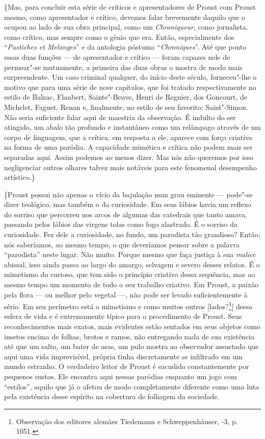 \{Mas, para concluir esta série de críticos e apresentadores de Proust
com Proust mesmo, como apresentador e crítico, devemos falar brevemente
daquilo que o ocupou ao lado de sua obra principal, como um
\emph{Chroniqueur}, como jornalista, como crítico, mas sempre como o
gênio que era. Então, especialmente dos ``\emph{Pastiches et Melanges}'' e
da antologia póstuma ``\emph{Chroniques}''. Até que ponto essas duas
funções --- de apresentador e crítico --- foram capazes nele de permear"-se
mutuamente, a primeira das duas obras o mostra de modo mais
surpreendente. Um caso criminal qualquer, do início deste século,
forneceu"-lhe o motivo que para uma série de nove capítulos, que foi
tratado respectivamente no estilo de Balzac, Flaubert, Sainte"-Beuve,
Henri de Regnier, dos Goncourt, de Michelet, Faguet, Renan e,
finalmente, no estilo de seu favorito: Saint"-Simon. Não seria suficiente
falar aqui de maestria da observação. É indulto do ser atingido, um
abalo tão profundo e instantâneo como um relâmpago através de um corpo
de linguagem, que a crítica, em resposta a ele, aparece com força
criativa na forma de uma paródia. A capacidade mimética e crítica não
podem mais ser separadas aqui. Assim podemos ao menos dizer. Mas nós não
queremos por isso negligenciar outros olhares talvez mais notáveis para
este fenomenal desempenho artístico.\}

\{Proust possui não apenas o vício da bajulação num grau eminente ---
pode"-se dizer teológico, mas também o da curiosidade. Em seus lábios
havia um reflexo do sorriso que percorreu nos arcos de algumas das
catedrais que tanto amava, passando pelos lábios das virgens tolas como
fogo alastrado. É o sorriso da curiosidade. Fez dele a curiosidade, no
fundo, um parodista tão grandioso? Então, nós saberíamos, ao mesmo
tempo, o que deveríamos pensar sobre a palavra ``parodista'' neste lugar.
Não muito. Porque mesmo que faça justiça à sua \emph{malice} abissal,
isso ainda passa ao largo do amargo, selvagem e severo desses relatos. É
o mimetismo do curioso, que tem sido o princípio criativo dessa
sequência, mas ao mesmo tempo um momento de todo o seu trabalho
criativo. Em Proust, a paixão pela flora --- ou melhor pelo vegetal ---,
não pode ser levado suficientemente à sério. Em seu perímetro está o
mimetismo e como muitos outros {[}lados?\footnote{Observação dos
  editores alemães Tiedemann e Schweppenhäuser, -3,
  p. 1051. \versal{[N. E.]}}{]} dessa esfera de vida e é extremamente típico para o
procedimento de Proust. Seus reconhecimentos mais exatos, mais evidentes
estão sentados em seus objetos como insetos encima de folhas, brotos e
ramos, não entregando nada de sua existência até que um salto, um bater
de asas, um pulo mostra ao observador assustado que aqui uma vida
imprevisível, própria tinha discretamente se infiltrado em um mundo
estranho. O verdadeiro leitor de Proust é sacudido constantemente por
pequenos sustos. Ele encontra aqui nessas paródias enquanto um jogo com
``estilos'', aquilo que já o afetou de modo completamente diferente como
uma luta pela existência desse espírito na cobertura de folhagem da
sociedade.

